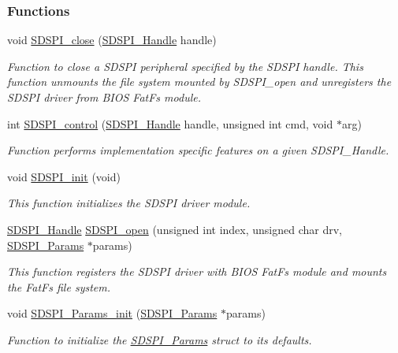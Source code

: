 \subsubsection*{Functions}
\begin{DoxyCompactItemize}
\item 
void \hyperlink{_s_d_s_p_i_8h_a8816c223935b575f10acd5277b9a8ca5}{S\+D\+S\+P\+I\+\_\+close} (\hyperlink{_s_d_s_p_i_8h_abd3d22133d60c2e5afd49722d6bafb7e}{S\+D\+S\+P\+I\+\_\+\+Handle} handle)
\begin{DoxyCompactList}\small\item\em Function to close a S\+D\+S\+P\+I peripheral specified by the S\+D\+S\+P\+I handle. This function unmounts the file system mounted by S\+D\+S\+P\+I\+\_\+open and unregisters the S\+D\+S\+P\+I driver from B\+I\+O\+S\textquotesingle{} Fat\+Fs module. \end{DoxyCompactList}\item 
int \hyperlink{_s_d_s_p_i_8h_a541a1db109382fe090ed7a9209a34f61}{S\+D\+S\+P\+I\+\_\+control} (\hyperlink{_s_d_s_p_i_8h_abd3d22133d60c2e5afd49722d6bafb7e}{S\+D\+S\+P\+I\+\_\+\+Handle} handle, unsigned int cmd, void $\ast$arg)
\begin{DoxyCompactList}\small\item\em Function performs implementation specific features on a given S\+D\+S\+P\+I\+\_\+\+Handle. \end{DoxyCompactList}\item 
void \hyperlink{_s_d_s_p_i_8h_a83cfcebe7875d9d8b5e08e57e6785ae6}{S\+D\+S\+P\+I\+\_\+init} (void)
\begin{DoxyCompactList}\small\item\em This function initializes the S\+D\+S\+P\+I driver module. \end{DoxyCompactList}\item 
\hyperlink{_s_d_s_p_i_8h_abd3d22133d60c2e5afd49722d6bafb7e}{S\+D\+S\+P\+I\+\_\+\+Handle} \hyperlink{_s_d_s_p_i_8h_af4a5ca9bb35e8a7df02acf20ceeae66d}{S\+D\+S\+P\+I\+\_\+open} (unsigned int index, unsigned char drv, \hyperlink{struct_s_d_s_p_i___params}{S\+D\+S\+P\+I\+\_\+\+Params} $\ast$params)
\begin{DoxyCompactList}\small\item\em This function registers the S\+D\+S\+P\+I driver with B\+I\+O\+S\textquotesingle{} Fat\+Fs module and mounts the Fat\+Fs file system. \end{DoxyCompactList}\item 
void \hyperlink{_s_d_s_p_i_8h_a6fe24eaba1cca88242c5df360a074ca8}{S\+D\+S\+P\+I\+\_\+\+Params\+\_\+init} (\hyperlink{struct_s_d_s_p_i___params}{S\+D\+S\+P\+I\+\_\+\+Params} $\ast$params)
\begin{DoxyCompactList}\small\item\em Function to initialize the \hyperlink{struct_s_d_s_p_i___params}{S\+D\+S\+P\+I\+\_\+\+Params} struct to its defaults. \end{DoxyCompactList}\end{DoxyCompactItemize}


